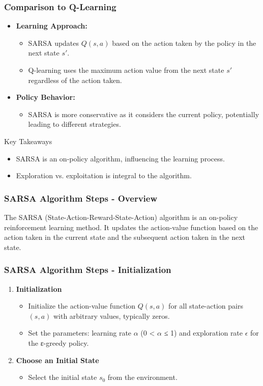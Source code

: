 \documentclass[aspectratio=169]{beamer}
\begin{document}
\begin{frame}[fragile]
    \frametitle{Comparison to Q-Learning}
    \begin{itemize}
        \item \textbf{Learning Approach:}
        \begin{itemize}
            \item SARSA updates \( Q(s, a) \) based on the action taken by the policy in the next state \( s' \).
            \item Q-learning uses the maximum action value from the next state \( s' \) regardless of the action taken.
        \end{itemize}
        \item \textbf{Policy Behavior:}
        \begin{itemize}
            \item SARSA is more conservative as it considers the current policy, potentially leading to different strategies.
        \end{itemize}
    \end{itemize}
    \begin{block}{Key Takeaways}
        \begin{itemize}
            \item SARSA is an on-policy algorithm, influencing the learning process.
            \item Exploration vs. exploitation is integral to the algorithm.
        \end{itemize}
    \end{block}
\end{frame}

\begin{frame}[fragile]
    \frametitle{SARSA Algorithm Steps - Overview}
    The SARSA (State-Action-Reward-State-Action) algorithm is an on-policy reinforcement learning method. It updates the action-value function based on the action taken in the current state and the subsequent action taken in the next state.
\end{frame}

\begin{frame}[fragile]
    \frametitle{SARSA Algorithm Steps - Initialization}
    \begin{enumerate}
        \item \textbf{Initialization}
        \begin{itemize}
            \item Initialize the action-value function \( Q(s, a) \) for all state-action pairs \( (s, a) \) with arbitrary values, typically zeros.
            \item Set the parameters: learning rate \( \alpha \) (0 < \( \alpha \) ≤ 1) and exploration rate \( \epsilon \) for the ε-greedy policy.
        \end{itemize}
        \item \textbf{Choose an Initial State}
        \begin{itemize}
            \item Select the initial state \( s_0 \) from the environment.
        \end{itemize}
    \end{enumerate}
\end{frame}
\end{document}
